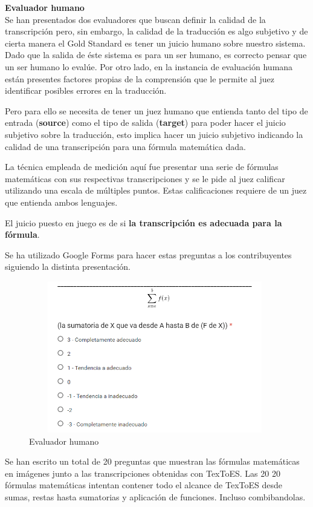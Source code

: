 {\Large \textbf{Evaluador humano}}\\

Se han presentados dos evaluadores que buscan definir la calidad de la transcripción pero, sin embargo, la calidad de la traducción es algo subjetivo y de cierta manera el Gold Standard es tener un juicio humano sobre nuestro sistema. Dado que la salida de éste sistema es para un ser humano, es correcto pensar que un ser humano lo evalúe. Por otro lado, en la instancia de evaluación humana están presentes factores propias de la comprensión que le permite al juez identificar posibles errores en la traducción.

Pero para ello se necesita de tener un juez humano que entienda tanto del tipo de entrada (\textbf{source}) como el tipo de salida (\textbf{target}) para poder hacer el juicio subjetivo sobre la traducción, esto implica hacer un juicio subjetivo indicando la calidad de una transcripción para una fórmula matemática dada.

La técnica empleada de medición aquí fue presentar una serie de fórmulas matemáticas con sus respectivas transcripciones y se le pide al juez calificar utilizando una escala de múltiples puntos. Estas calificaciones requiere de un juez que entienda ambos lenguajes.

El juicio puesto en juego es de si \textbf{la transcripción es adecuada para la fórmula}.

Se ha utilizado Google Forms para hacer estas preguntas a los contribuyentes siguiendo la distinta presentación.

\begin{figure}[H]
\centering
  \includegraphics[width=11cm, height=6.62cm]{Figures/evaluadorhumano}
  \caption[]{Evaluador humano}
\label{fig:evaluadorhumano}
\end{figure}

Se han escrito un total de 20 preguntas que muestran las fórmulas matemáticas en imágenes junto a las transcripciones obtenidas con TexToES. Las 20 20 fórmulas matemáticas intentan contener todo el alcance de TexToES desde sumas, restas hasta sumatorias y aplicación de funciones. Incluso combibandolas.

